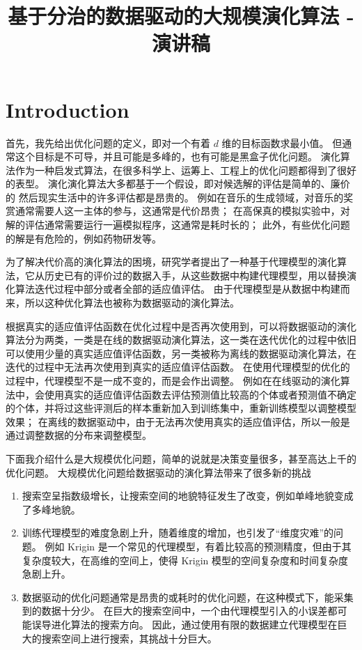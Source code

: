\documentclass[
  UTF8,
  twoside,
  zihao=5,
  scheme=plain,
  heading=true,
]{ctexart}
\title{基于分治的数据驱动的大规模演化算法 - 演讲稿}
\begin{document}
\maketitle

\section{Introduction}

首先，我先给出优化问题的定义，即对一个有着 $d$ 维的目标函数求最小值。
但通常这个目标是不可导，并且可能是多峰的，也有可能是黑盒子优化问题。
演化算法作为一种启发式算法，在很多科学上、运筹上、工程上的优化问题都得到了很好的表型。
演化演化算法大多都基于一个假设，即对候选解的评估是简单的、廉价的
然后现实生活中的许多评估都是昂贵的。
例如在音乐的生成领域，对音乐的奖赏通常需要人这一主体的参与，这通常是代价昂贵；
在高保真的模拟实验中，对解的评估通常需要运行一遍模拟程序，这通常是耗时长的；
此外，有些优化问题的解是有危险的，例如药物研发等。

为了解决代价高的演化算法的困境，研究学者提出了一种基于代理模型的演化算法，它从历史已有的评价过的数据入手，从这些数据中构建代理模型，用以替换演化算法迭代过程中部分或者全部的适应值评估。
由于代理模型是从数据中构建而来，所以这种优化算法也被称为数据驱动的演化算法。

根据真实的适应值评估函数在优化过程中是否再次使用到，可以将数据驱动的演化算法分为两类，一类是在线的数据驱动演化算法，这一类在迭代优化的过程中依旧可以使用少量的真实适应值评估函数，另一类被称为离线的数据驱动演化算法，在迭代的过程中无法再次使用到真实的适应值评估函数。
在使用代理模型的优化的过程中，代理模型不是一成不变的，而是会作出调整。
例如在在线驱动的演化算法中，会使用真实的适应值评估函数去评估预测值比较高的个体或者预测值不确定的个体，并将过这些评测后的样本重新加入到训练集中，重新训练模型以调整模型效果；
在离线的数据驱动中，由于无法再次使用真实的适应值评估，所以一般是通过调整数据的分布来调整模型。

下面我介绍什么是大规模优化问题，简单的说就是决策变量很多，甚至高达上千的优化问题。
大规模优化问题给数据驱动的演化算法带来了很多新的挑战
\begin{enumerate}
  \item 搜索空呈指数级增长，让搜索空间的地貌特征发生了改变，例如单峰地貌变成了多峰地貌。
  \item 训练代理模型的难度急剧上升，随着维度的增加，也引发了“维度灾难”的问题。
  例如 Krigin 是一个常见的代理模型，有着比较高的预测精度，但由于其复杂度较大，在高维的空间上，使得 Krigin 模型的空间复杂度和时间复杂度急剧上升。
  \item 数据驱动的优化问题通常是昂贵的或耗时的优化问题，在这种模式下，能采集到的数据十分少。
  在巨大的搜索空间中，一个由代理模型引入的小误差都可能误导进化算法的搜索方向。
  因此，通过使用有限的数据建立代理模型在巨大的搜索空间上进行搜索，其挑战十分巨大。
\end{enumerate}
\end{document}
